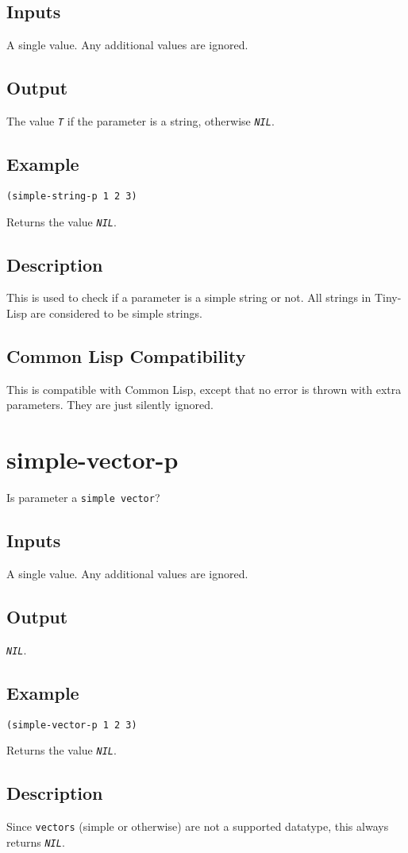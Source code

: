 \documentclass[10pt, openany]{book}
\newcommand{\constant}[1]{\emph{\texttt{#1}}}
\newcommand{\datatype}[1]{\texttt{#1}}
\newcommand{\tl}{Tiny-Lisp}
\newcommand{\cl}{Common Lisp}
\begin{document}
\subsection{Inputs}
A single value.  Any additional values are ignored.
\subsection{Output}
The value \constant{T} if the parameter is a string, otherwise \constant{NIL}.
\subsection{Example}
\begin{lstlisting}
(simple-string-p 1 2 3)
\end{lstlisting}
Returns the value \constant{NIL}.
\subsection{Description}
This is used to check if a parameter is a simple string or not.  All strings in \tl{} are considered to be simple strings.
\subsection{Common Lisp Compatibility}
This is compatible with \cl, except that no error is thrown with extra parameters.  They are just silently ignored.

\section{simple-vector-p}
Is parameter a \datatype{simple vector}?
\subsection{Inputs}
A single value.  Any additional values are ignored.
\subsection{Output}
\constant{NIL}.
\subsection{Example}
\begin{lstlisting}
(simple-vector-p 1 2 3)
\end{lstlisting}
Returns the value \constant{NIL}.
\subsection{Description}
Since \datatype{vectors} (simple or otherwise) are not a supported datatype, this always returns \constant{NIL}.
\end{document}
